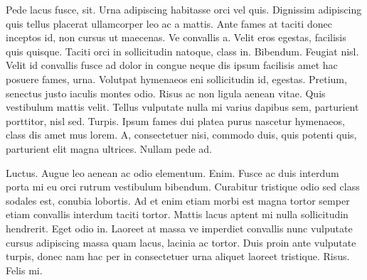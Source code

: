 \documentclass[a5paper,10pt,twocolumn,twoside]{book}
\begin{document}
Pede lacus fusce, sit. Urna adipiscing habitasse orci vel quis. Dignissim adipiscing quis tellus placerat ullamcorper leo ac a mattis. Ante fames at taciti donec inceptos id, non cursus ut maecenas. Ve convallis a. Velit eros egestas, facilisis quis quisque. Taciti orci in sollicitudin natoque, class in. Bibendum. Feugiat nisl. Velit id convallis fusce ad dolor in congue neque dis ipsum facilisis amet hac posuere fames, urna. Volutpat hymenaeos eni sollicitudin id, egestas. Pretium, senectus justo iaculis montes odio. Risus ac non ligula aenean vitae. Quis vestibulum mattis velit. Tellus vulputate nulla mi varius dapibus sem, parturient porttitor, nisl sed. Turpis. Ipsum fames dui platea purus nascetur hymenaeos, class dis amet mus lorem. A, consectetuer nisi, commodo duis, quis potenti quis, parturient elit magna ultrices. Nullam pede ad.

Luctus. Augue leo aenean ac odio elementum. Enim. Fusce ac duis interdum porta mi eu orci rutrum vestibulum bibendum. Curabitur tristique odio sed class sodales est, conubia lobortis. Ad et enim etiam morbi est magna tortor semper etiam convallis interdum taciti tortor. Mattis lacus aptent mi nulla sollicitudin hendrerit. Eget odio in. Laoreet at massa ve imperdiet convallis nunc vulputate cursus adipiscing massa quam lacus, lacinia ac tortor. Duis proin ante vulputate turpis, donec nam hac per in consectetuer urna aliquet laoreet tristique. Risus. Felis mi.
\end{document}
